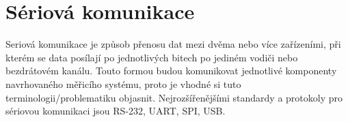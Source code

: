 \chapter{Sériová komunikace}
\label{Sériová komunikace}
Seriová komunikace je způsob přenosu dat mezi dvěma nebo více zařízeními, při kterém se data posílají po jednotlivých bitech po jediném vodiči nebo bezdrátovém kanálu. Touto formou budou komunikovat jednotlivé komponenty navrhovaného měřicího systému, proto je vhodné si tuto terminologii/problematiku objasnit. Nejrozšířenějšími standardy a protokoly pro sériovou komunikaci jsou RS-232, UART, SPI, USB. \cite{ser kom}




